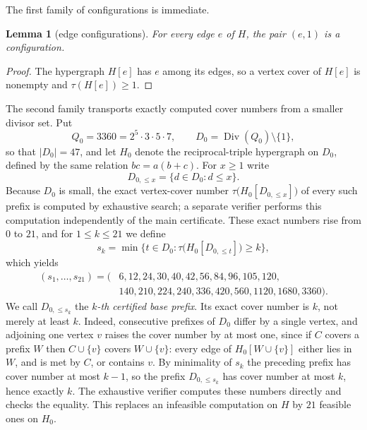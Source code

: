 \documentclass[11pt]{article}
\newtheorem{lemma}[theorem]{Lemma}
\theoremstyle{definition}
\theoremstyle{plain}
\begin{document}
The first family of configurations is immediate.

\begin{lemma}[edge configurations]\label{lem:edge}
For every edge $e$ of $H$, the pair $(e,1)$ is a configuration.
\end{lemma}
\begin{proof}
The hypergraph $H[e]$ has $e$ among its edges, so a vertex cover of $H[e]$ is
nonempty and $\tau(H[e])\geq1$.
\end{proof}

The second family transports exactly computed cover numbers from a smaller
divisor set.  Put
\[
 Q_0=3360=2^5\cdot3\cdot5\cdot7,
 \qquad D_0=\operatorname{Div}(Q_0)\setminus\{1\},
\]
so that $|D_0|=47$, and let $H_0$ denote the reciprocal-triple hypergraph on
$D_0$, defined by the same relation $bc=a(b+c)$.  For $x\geq1$ write
\[
 D_{0,\leq x}=\{d\in D_0:d\leq x\}.
\]
Because $D_0$ is small, the exact vertex-cover number
$\tau\bigl(H_0[D_{0,\leq x}]\bigr)$ of every such prefix is computed by
exhaustive search; a separate verifier performs this computation
independently of the main certificate.  These exact numbers rise from $0$ to
$21$, and for $1\leq k\leq21$ we define
\[
 s_k=\min\bigl\{t\in D_0:\tau\bigl(H_0[D_{0,\leq t}]\bigr)\geq k\bigr\},
\]
which yields
\[
 \begin{aligned}
 (s_1,\ldots,s_{21})=(
 &6,12,24,30,40,42,56,84,96,105,120,\\
 &140,210,224,240,336,420,560,1120,1680,3360).
 \end{aligned}
\]
We call $D_{0,\leq s_k}$ the \emph{$k$-th certified base prefix}.  Its exact
cover number is $k$, not merely at least $k$.  Indeed, consecutive prefixes
of $D_0$ differ by a single vertex, and adjoining one vertex $v$ raises the
cover number by at most one, since if $C$ covers a prefix $W$ then
$C\cup\{v\}$ covers $W\cup\{v\}$: every edge of $H_0[W\cup\{v\}]$ either lies
in $W$, and is met by $C$, or contains $v$.  By minimality of $s_k$ the
preceding prefix has cover number at most $k-1$, so the prefix
$D_{0,\leq s_k}$ has cover number at most $k$, hence exactly $k$.  The
exhaustive verifier computes these numbers directly and checks the equality.
This replaces an infeasible computation on $H$ by $21$ feasible ones on
$H_0$.
\end{document}
